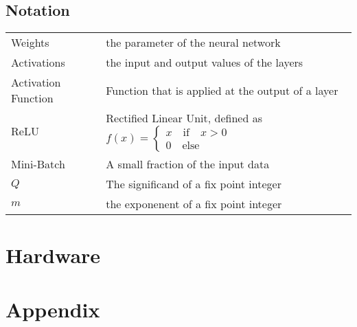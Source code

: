 \documentclass[a4paper]{article}
\begin{document}
\subsection*{Notation}
\begin{center}
\begin{tabular}{lp{3.5in}}
	Weights 	& the parameter of the neural network		\\
	Activations	& the input and output values of the layers	\\
	Activation Function & Function that is applied at the output of a layer \\
	ReLU		& Rectified Linear Unit, defined as  $f(x) = \begin{cases}
		x \quad \text{if} \quad x > 0 \\
		0 \quad \text{else}
	\end{cases}$						\\
	Mini-Batch	& A small fraction of the input data \\
	$Q$			& The significand of a fix point integer 	\\
	$m$			& the exponenent of a fix point integer		
\end{tabular}
\end{center}









\section{Hardware}










\section{Appendix}








\listoffigures
\listoftables
\listoftodos
\end{document}

